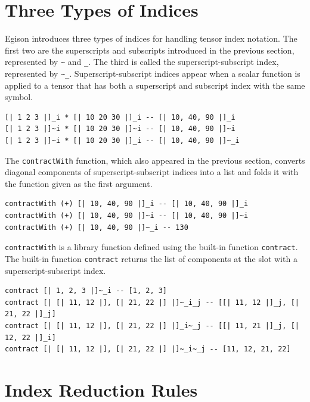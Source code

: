\section{Three Types of Indices}\label{tensor-index}

Egison introduces three types of indices for handling tensor index notation.
The first two are the superscripts and subscripts introduced in the previous section, represented by \lstinline{~} and \lstinline{_}.
The third is called the superscript-subscript index, represented by \lstinline{~_}.
Superscript-subscript indices appear when a scalar function is applied to a tensor that has both a superscript and subscript index with the same symbol.
\begin{lstlisting}[language=egison,numbers=none]
[| 1 2 3 |]_i * [| 10 20 30 |]_i -- [| 10, 40, 90 |]_i
[| 1 2 3 |]~i * [| 10 20 30 |]~i -- [| 10, 40, 90 |]~i
[| 1 2 3 |]~i * [| 10 20 30 |]_i -- [| 10, 40, 90 |]~_i
\end{lstlisting}

The \lstinline{contractWith} function, which also appeared in the previous section, converts diagonal components of superscript-subscript indices into a list and folds it with the function given as the first argument.
\begin{lstlisting}[language=egison,numbers=none]
contractWith (+) [| 10, 40, 90 |]_i -- [| 10, 40, 90 |]_i
contractWith (+) [| 10, 40, 90 |]~i -- [| 10, 40, 90 |]~i
contractWith (+) [| 10, 40, 90 |]~_i -- 130
\end{lstlisting}

\lstinline{contractWith} is a library function defined using the built-in function \lstinline{contract}.
The built-in function \lstinline{contract} returns the list of components at the slot with a superscript-subscript index.
\begin{lstlisting}[language=egison,numbers=none]
contract [| 1, 2, 3 |]~_i -- [1, 2, 3]
contract [| [| 11, 12 |], [| 21, 22 |] |]~_i_j -- [[| 11, 12 |]_j, [| 21, 22 |]_j]
contract [| [| 11, 12 |], [| 21, 22 |] |]_i~_j -- [[| 11, 21 |]_j, [| 12, 22 |]_i]
contract [| [| 11, 12 |], [| 21, 22 |] |]~_i~_j -- [11, 12, 21, 22]
\end{lstlisting}

\section{Index Reduction Rules}\label{tensor-rules}

